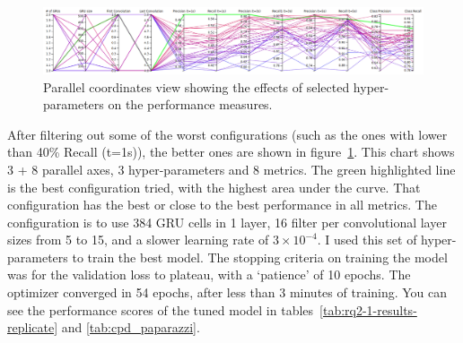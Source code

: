 

\begin{figure}
    \centering
    \includegraphics[width=\columnwidth]{RQ3-5_charts/refined_prec_recall_white_background.png}
    \caption{Parallel coordinates view showing the effects of selected hyper-parameters on the performance measures.}
    \label{fig:precision_recall_parallel_coordinates}
\end{figure}
After filtering out some of the worst configurations (such as the ones with lower than 40\% Recall (t=1s)), the better ones are shown in figure~\ref{fig:precision_recall_parallel_coordinates}. 
This chart shows 3 + 8 parallel axes, 3 hyper-parameters and 8 metrics. 
The green highlighted line is the best configuration tried, with the highest area under the curve. That configuration has the best or close to the best performance in all metrics. 
The configuration is to use 384 GRU cells in 1 layer, 16 filter per convolutional layer sizes from 5 to 15, and a slower learning rate of $3\times10^{-4}$.
I used this set of hyper-parameters to train the best model. The stopping criteria on training the model was for the validation loss to plateau, with a `patience' of 10 epochs. The optimizer converged in 54 epochs, after less than 3 minutes of training.
You can see the performance scores of the tuned model in tables~\ref{tab:rq2-1-results-replicate} and \ref{tab:cpd_paparazzi}.

